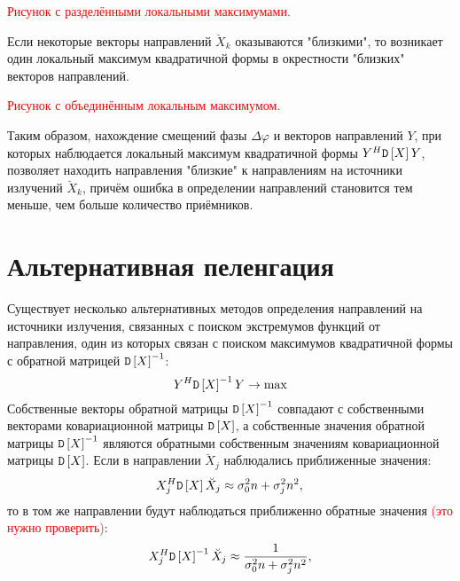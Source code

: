 \textcolor{red}{Рисунок с разделёнными локальными максимумами.}

Если некоторые векторы направлений $\breve{X}_k$ оказываются "близкими"{}, то возникает один локальный максимум квадратичной формы в окрестности
"близких"{} векторов направлений.

\textcolor{red}{Рисунок с объединённым локальным максимумом.}

Таким образом, нахождение смещений фазы $\Delta \varphi$ и векторов направлений $Y$, при которых наблюдается локальный максимум квадратичной формы
$Y^H \mathtt{D} \left [ X \right ] Y$, позволяет находить направления "близкие"{} к направлениям на источники излучений $\breve{X}_k$, причём ошибка в определении направлений
становится тем меньше, чем больше количество приёмников.

\section{Альтернативная пеленгация}

Существует несколько альтернативных методов определения направлений на источники излучения, связанных с поиском экстремумов функций от направления, один из которых
связан с поиском максимумов квадратичной формы с обратной матрицей $\mathtt{D} \left [ X \right ]^{-1}$:
\[
    Y^H \mathtt{D} \left [ X \right ]^{-1} Y \rightarrow \max
\]
Собственные векторы обратной матрицы $\mathtt{D} \left [ X \right ]^{-1}$ совпадают с собственными векторами ковариационной матрицы $\mathtt{D} \left [ X \right ]$, а собственные значения
обратной матрицы $\mathtt{D} \left [ X \right ]^{-1}$ являются обратными собственным значениям ковариационной матрицы $\mathtt{D} \left [ X \right ]$. Если в направлении $\breve{X}_j$
наблюдались приближенные значения:
\[
    X_j^H \mathtt{D} \left [ X \right ] \breve{X}_j \approx \sigma_0^2 n + \sigma_j^2 n^2 , \\
\]
то в том же направлении будут наблюдаться приближенно обратные значения \textcolor{red}{(это нужно проверить)}:
\[
    X_j^H \mathtt{D} \left [ X \right ]^{-1} \breve{X}_j \approx \frac{1}{\sigma_0^2 n + \sigma_j^2 n^2} ,
\]
